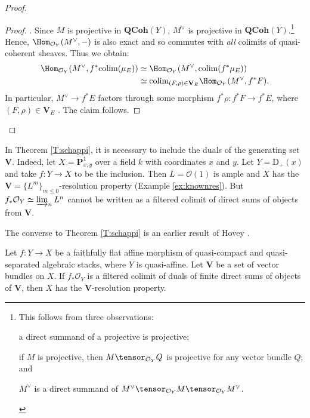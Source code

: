 \documentclass[reqno,a4paper]{amsart}
\numberwithin{Theorem}{section}
\newcommand{\Orb}{\mathcal{O}}
\newcommand{\Vect}{\mathbf{V}}
\newcommand{\QCoh}{\mathbf{QCoh}}
\theoremstyle{plain}
\theoremstyle{remark}
\newcommand{\spref}[1]{\href{https://stacks.math.columbia.edu/tag/#1}{#1}}
\begin{document}
\begin{proof}
\begin{proof}
  \cite[Lem.~1.2(iii)]{perfect_complexes_stacks}. Since $M$ is projective in $\QCoh(Y)$, $M^\vee$ is projective in $\QCoh(Y)$.\footnote{This follows from three observations:
    \begin{enumerate*}
    \item a direct summand of a projective is projective;
    \item if $M$ is projective, then $M\tensor_{\Orb_Y} Q$ is
      projective for any vector bundle $Q$; and
    \item $M^\vee$ is a direct summand of
      $M^\vee \tensor_{\Orb_Y} M \tensor_{\Orb_Y} M^\vee$.
    \end{enumerate*}} Hence, $\Hom_{\Orb_Y}(M^\vee,-)$ is also exact and
  so commutes with \emph{all} colimits of quasi-coherent sheaves. Thus we obtain:
  \begin{align*}
    \Hom_{\Orb_Y}(M^\vee,f^*\text{colim}(\mu_E))&\simeq\Hom_{\Orb_Y}(M^\vee,\text{colim}(f^* \mu_E))\\
    &\simeq\text{colim}_{(F,\rho) \in \Vect_E}\Hom_{\Orb_Y}(M^\vee,f^*F).
  \end{align*}
In particular, $M^\vee \to f^*E$ factors
  through some morphism $f^*\rho\colon f^*F \to f^*E$, where
  $(F,\rho) \in \Vect_E$ \cite[Tag \spref{09WR}]{stacks-project}. The
  claim follows. 
\end{proof}
\end{proof}
\begin{Example}
   In Theorem \ref{T:schappi}, it is necessary to include the duals of the generating
set $\mathbf{V}$. Indeed, let $X=\mathbf{P}^1_{x,y}$ over a field $k$ with coordinates $x$ and $y$. Let $Y=\mathrm{D}_+(x)$ and take $f\colon Y\to X$ to be the inclusion. Then $L=\Orb(1)$ is ample and $X$ has the $\mathbf{V} = \{ L^{m}\}_{m\leq 0}$-resolution property (Example \ref{ex:knownres}). But $f_*\Orb_Y\simeq \varinjlim_n L^n$ cannot be written as a filtered colimit of direct sums of objects from $\mathbf{V}$. 
\end{Example}
The converse to Theorem \ref{T:schappi} is an earlier result of Hovey \cite[Prop.~1.4.4]{MR2066503}.
\begin{proposition}\label{P:schappi-converse}
  Let $f \colon Y\to X$ be a faithfully flat affine morphism of quasi-compact and quasi-separated algebraic stacks, where $Y$ is quasi-affine. Let
  $\Vect$ be a set of vector bundles on $X$. If
  $f_*\Orb_{Y}$ is a filtered colimit of duals of finite direct sums of objects of $\Vect$, then $X$ has the $\mathbf{V}$-resolution property.
\end{proposition}
\end{document}
